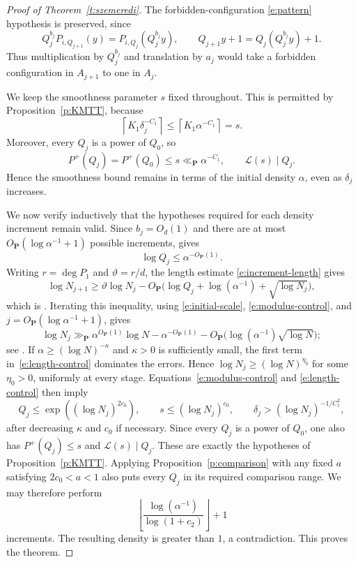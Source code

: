 \documentclass[12pt]{amsart}
\newcommand{\1}{\mathbf 1}
\begin{document}
\begin{proof}[Proof of Theorem~\ref{t:szemeredi}]
The forbidden-configuration \eqref{e:pattern} hypothesis is preserved, since
\[
 Q_j^{b_j}P_{i,Q_{j+1}}(y)
 =P_{i,Q_j}(Q_j^{b_j}y),
 \qquad
 Q_{j+1}y+1=Q_j(Q_j^{b_j}y)+1.
\]
Thus multiplication by $Q_j^{b_j}$ and translation by $a_j$ would
take a forbidden configuration in $A_{j+1}$ to one in $A_j$.

We keep the smoothness parameter $s$ fixed throughout. This is
permitted by Proposition~\ref{p:KMTT}, because
\[
 \left\lceil K_1\delta_j^{-C_1}\right\rceil
 \leq \left\lceil K_1\alpha^{-C_1}\right\rceil=s.
\]
Moreover, every $Q_j$ is a power of $Q_0$, so
\[
 P^+(Q_j)=P^+(Q_0)\leq s\ll_{\mathbf P}\alpha^{-C_1},
 \qquad \mathcal L(s)\mid Q_j.
\]
Hence the smoothness bound remains in terms of the initial density
$\alpha$, even as $\delta_j$ increases.

We now verify inductively that the hypotheses required for each
density increment remain valid.  Since $b_j=O_d(1)$ and there are at most
$O_{\mathbf P}(\log\alpha^{-1}+1)$ possible increments,
\cite[(5.57)]{KMTT} gives
\begin{equation}\label{e:modulus-control}
 \log Q_j\leq\alpha^{-O_{\mathbf P}(1)}.
\end{equation}
Writing $r=\deg P_1$ and $\vartheta=r/d$, the length estimate
\eqref{e:increment-length} gives
\begin{equation}\label{e:length-recursion}
 \log N_{j+1}\geq\vartheta\log N_j
 -O_{\mathbf P}\bigl(\log Q_j+\log(\alpha^{-1})
 +\sqrt{\log N_j}\bigr),
\end{equation}
which is \cite[(5.58)]{KMTT}.  Iterating this inequality, using
\eqref{e:initial-scale}, \eqref{e:modulus-control}, and
$j=O_{\mathbf P}(\log\alpha^{-1}+1)$, gives
\begin{equation}\label{e:length-control}
 \log N_j\gg_{\mathbf P}
 \alpha^{O_{\mathbf P}(1)}\log N
 -\alpha^{-O_{\mathbf P}(1)}
 -O_{\mathbf P}\bigl(\log(\alpha^{-1})\sqrt{\log N}\bigr);
\end{equation}
see \cite[(5.59)]{KMTT}.
If $\alpha\geq(\log N)^{-\kappa}$ and $\kappa>0$ is sufficiently small,
the first term in~\eqref{e:length-control} dominates the errors.  Hence
$\log N_j\geq(\log N)^{\eta_0}$ for some $\eta_0>0$, uniformly at every
stage.  Equations~\eqref{e:modulus-control} and
\eqref{e:length-control} then imply
\[
 Q_j\leq\exp((\log N_j)^{2c_0}),\qquad
 s\leq(\log N_j)^{c_0},\qquad
 \delta_j>(\log N_j)^{-1/C_1^2},
\]
after decreasing $\kappa$ and $c_0$ if necessary.  Since every
$Q_j$ is a power of $Q_0$, one also has
$P^+(Q_j)\leq s$ and $\mathcal L(s)\mid Q_j$.  These are exactly the
hypotheses of Proposition~\ref{p:KMTT}.  Applying
Proposition~\ref{p:comparison} with any fixed $a$ satisfying
$2c_0<a<1$ also puts every $Q_j$ in its required comparison range.
We may therefore perform
\[
 \left\lfloor\frac{\log(\alpha^{-1})}{\log(1+c_2)}\right\rfloor+1
\]
increments.  The resulting density is greater than $1$, a contradiction.
This proves the theorem.
\end{proof}
\end{document}
